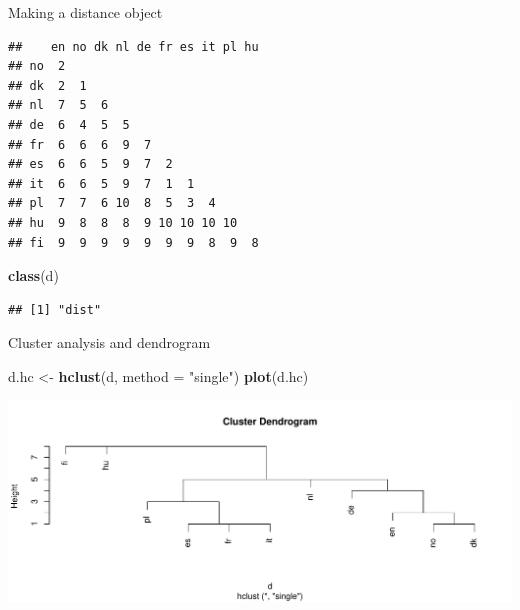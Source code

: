 \documentclass[
  ignorenonframetext,
]{beamer}
\newenvironment{Shaded}{\begin{snugshade}}{\end{snugshade}}
\newcommand{\DataTypeTok}[1]{\textcolor[rgb]{0.13,0.29,0.53}{#1}}
\newcommand{\KeywordTok}[1]{\textcolor[rgb]{0.13,0.29,0.53}{\textbf{#1}}}
\newcommand{\NormalTok}[1]{#1}
\newcommand{\OperatorTok}[1]{\textcolor[rgb]{0.81,0.36,0.00}{\textbf{#1}}}
\newcommand{\StringTok}[1]{\textcolor[rgb]{0.31,0.60,0.02}{#1}}
\begin{document}
\begin{frame}[fragile]{Making a distance object}
\protect\hypertarget{making-a-distance-object}{}

\begin{Shaded}
\end{Shaded}

\begin{verbatim}
##    en no dk nl de fr es it pl hu
## no  2                           
## dk  2  1                        
## nl  7  5  6                     
## de  6  4  5  5                  
## fr  6  6  6  9  7               
## es  6  6  5  9  7  2            
## it  6  6  5  9  7  1  1         
## pl  7  7  6 10  8  5  3  4      
## hu  9  8  8  8  9 10 10 10 10   
## fi  9  9  9  9  9  9  9  8  9  8
\end{verbatim}

\begin{Shaded}
\begin{Highlighting}[]
\KeywordTok{class}\NormalTok{(d)}
\end{Highlighting}
\end{Shaded}

\begin{verbatim}
## [1] "dist"
\end{verbatim}

\end{frame}

\begin{frame}[fragile]{Cluster analysis and dendrogram}
\protect\hypertarget{cluster-analysis-and-dendrogram}{}

\begin{Shaded}
\begin{Highlighting}[]
\NormalTok{d.hc <-}\StringTok{ }\KeywordTok{hclust}\NormalTok{(d, }\DataTypeTok{method =} \StringTok{"single"}\NormalTok{)}
\KeywordTok{plot}\NormalTok{(d.hc)}
\end{Highlighting}
\end{Shaded}

\includegraphics{slides_d29_files/figure-beamer/unnamed-chunk-360-1.pdf}

\end{frame}
\end{document}
